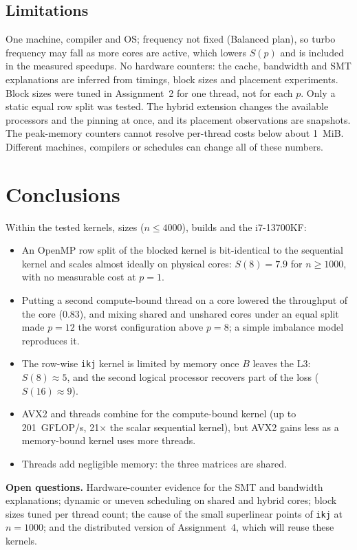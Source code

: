 \documentclass[11pt,a4paper]{article}
\begin{document}
\subsection{Limitations}

One machine, compiler and OS; frequency not fixed (Balanced plan), so turbo frequency may
fall as more cores are active, which lowers $S(p)$ and is included in the measured
speedups. No hardware counters: the cache, bandwidth and SMT explanations are inferred from
timings, block sizes and placement experiments. Block sizes were tuned in Assignment~2 for
one thread, not for each $p$. Only a static equal row split was tested. The hybrid extension
changes the available processors and the pinning at once, and its placement observations
are snapshots. The peak-memory counters cannot resolve per-thread costs below about 1~MiB.
Different machines, compilers or schedules can change all of these numbers.

\section{Conclusions}

Within the tested kernels, sizes ($n \le 4000$), builds and the i7-13700KF:
\begin{itemize}
    \item An OpenMP row split of the blocked kernel is bit-identical to the sequential
    kernel and scales almost ideally on physical cores: $S(8) = 7.9$ for $n \ge 1000$, with
    no measurable cost at $p = 1$.
    \item Putting a second compute-bound thread on a core lowered the throughput of the core
    (0.83), and mixing shared and unshared cores under an equal split made $p = 12$ the
    worst configuration above $p = 8$; a simple imbalance model reproduces it.
    \item The row-wise \texttt{ikj} kernel is limited by memory once $B$ leaves the L3:
    $S(8) \approx 5$, and the second logical processor recovers part of the loss
    ($S(16) \approx 9$).
    \item AVX2 and threads combine for the compute-bound kernel (up to 201~GFLOP/s, 21$\times$
    the scalar sequential kernel), but AVX2 gains less as a memory-bound kernel uses more
    threads.
    \item Threads add negligible memory: the three matrices are shared.
\end{itemize}

\textbf{Open questions.} Hardware-counter evidence for the SMT and bandwidth explanations;
dynamic or uneven scheduling on shared and hybrid cores; block sizes tuned per thread count;
the cause of the small superlinear points of \texttt{ikj} at $n = 1000$; and the
distributed version of Assignment~4, which will reuse these kernels.
\end{document}
